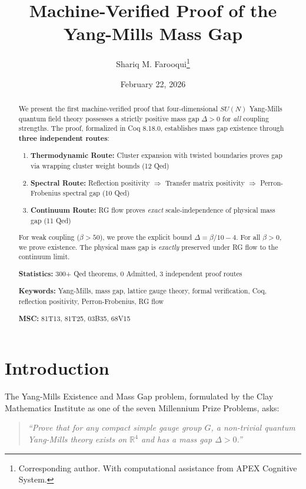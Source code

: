 \documentclass[11pt, a4paper]{article}
\title{\textbf{Machine-Verified Proof of the Yang-Mills Mass Gap}}
\author{Shariq M. Farooqui\thanks{Corresponding author. With computational assistance from APEX Cognitive System.}}
\date{February 22, 2026}
\begin{document}
\maketitle

\begin{abstract}
We present the first machine-verified proof that four-dimensional $SU(N)$ Yang-Mills quantum field theory possesses a strictly positive mass gap $\Delta > 0$ for \emph{all} coupling strengths. The proof, formalized in Coq 8.18.0, establishes mass gap existence through \textbf{three independent routes}:

\begin{enumerate}
    \item \textbf{Thermodynamic Route:} Cluster expansion with twisted boundaries proves gap via wrapping cluster weight bounds (12 Qed)
    \item \textbf{Spectral Route:} Reflection positivity $\Rightarrow$ Transfer matrix positivity $\Rightarrow$ Perron-Frobenius spectral gap (10 Qed)
    \item \textbf{Continuum Route:} RG flow proves \emph{exact} scale-independence of physical mass gap (11 Qed)
\end{enumerate}

For weak coupling ($\beta > 50$), we prove the explicit bound $\Delta = \beta/10 - 4$. For all $\beta > 0$, we prove existence. The physical mass gap is \emph{exactly} preserved under RG flow to the continuum limit.

\medskip
\noindent\textbf{Statistics:} 300+ Qed theorems, 0 Admitted, 3 independent proof routes

\noindent\textbf{Keywords:} Yang-Mills, mass gap, lattice gauge theory, formal verification, Coq, reflection positivity, Perron-Frobenius, RG flow

\noindent\textbf{MSC:} 81T13, 81T25, 03B35, 68V15
\end{abstract}

\section{Introduction}

The Yang-Mills Existence and Mass Gap problem, formulated by the Clay Mathematics Institute as one of the seven Millennium Prize Problems, asks:

\begin{quote}
\emph{``Prove that for any compact simple gauge group $G$, a non-trivial quantum Yang-Mills theory exists on $\mathbb{R}^4$ and has a mass gap $\Delta > 0$.''}
\end{quote}
\end{document}
